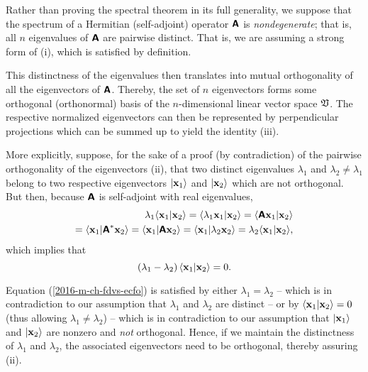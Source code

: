 {\color{OliveGreen}
\bproof
Rather than proving the spectral theorem in its full generality,
we suppose that the spectrum of a Hermitian (self-adjoint) operator $ \textsf{\textbf{A}}$ is {\em nondegenerate};
that is, all $n$ eigenvalues of $\textsf{\textbf{A}}$ are pairwise distinct.
That is, we are assuming a strong form of (i), which is satisfied by definition.

This distinctness of the eigenvalues then translates into mutual orthogonality of all the eigenvectors of $ \textsf{\textbf{A}}$.
Thereby, the set of $n$ eigenvectors forms some orthogonal (orthonormal) basis of the $n$-dimensional linear vector space $\frak V$.
The respective normalized eigenvectors can then be represented by perpendicular projections which can be summed up to yield the identity
(iii).

More explicitly, suppose, for the sake of a proof (by contradiction) of the pairwise orthogonality of the eigenvectors (ii),
that two distinct eigenvalues
$\lambda_1$
and
$\lambda_2 \neq \lambda_1$
belong to two respective eigenvectors
$\vert {\bf x}_1\rangle $
and
$\vert {\bf x}_2\rangle $
which are not orthogonal.
But then, because $\textsf{\textbf{A}}$ is self-adjoint with real eigenvalues,
\begin{equation}
\begin{split}
\lambda_1  \langle {\bf x}_1 \vert {\bf x}_2 \rangle =
\langle \lambda_1  {\bf x}_1 \vert {\bf x}_2 \rangle =
  \langle \textsf{\textbf{A}}{\bf x}_1 \vert {\bf x}_2 \rangle \\=
  \langle {\bf x}_1 \vert \textsf{\textbf{A}}^\ast  {\bf x}_2 \rangle =
  \langle {\bf x}_1 \vert \textsf{\textbf{A}}{\bf x}_2 \rangle =
  \langle {\bf x}_1 \vert \lambda_2 {\bf x}_2 \rangle=
  \lambda_2 \langle {\bf x}_1 \vert {\bf x}_2 \rangle,
\end{split}
\end{equation}
which implies that
\begin{equation}
\left(\lambda_1 - \lambda_2\right)
\langle {\bf x}_1 \vert {\bf x}_2 \rangle
=
0
.
\label{2016-m-ch-fdvs-ecfo}
\end{equation}

Equation (\ref{2016-m-ch-fdvs-ecfo}) is satisfied by
either $\lambda_1  = \lambda_2$
--
which is in contradiction to our assumption that $\lambda_1$ and $\lambda_2$ are distinct
--
or by  $\langle {\bf x}_1 \vert {\bf x}_2 \rangle =0$  (thus allowing $\lambda_1  \neq \lambda_2$) --
which is in contradiction to our assumption that $\vert {\bf x}_1\rangle$ and $\vert  {\bf x}_2\rangle$
are nonzero and {\em not} orthogonal.
Hence, if we maintain the distinctness of $\lambda_1$ and $\lambda_2$, the associated eigenvectors need to be orthogonal,
thereby assuring (ii).

}
